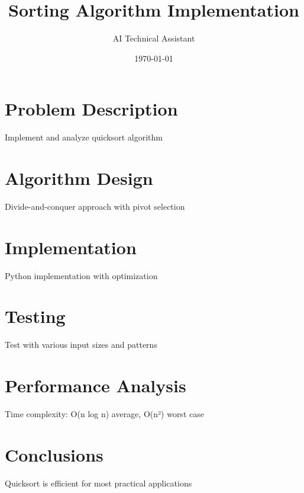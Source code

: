 \documentclass[12pt,a4paper]{article}
\title{Sorting Algorithm Implementation}
\author{AI Technical Assistant}
\date{\today}
\begin{document}
\maketitle
\tableofcontents
\newpage

\section{Problem Description}
Implement and analyze quicksort algorithm

\section{Algorithm Design}
Divide-and-conquer approach with pivot selection

\section{Implementation}
Python implementation with optimization

\section{Testing}
Test with various input sizes and patterns

\section{Performance Analysis}
Time complexity: O(n log n) average, O(n²) worst case

\section{Conclusions}
Quicksort is efficient for most practical applications
\end{document}
